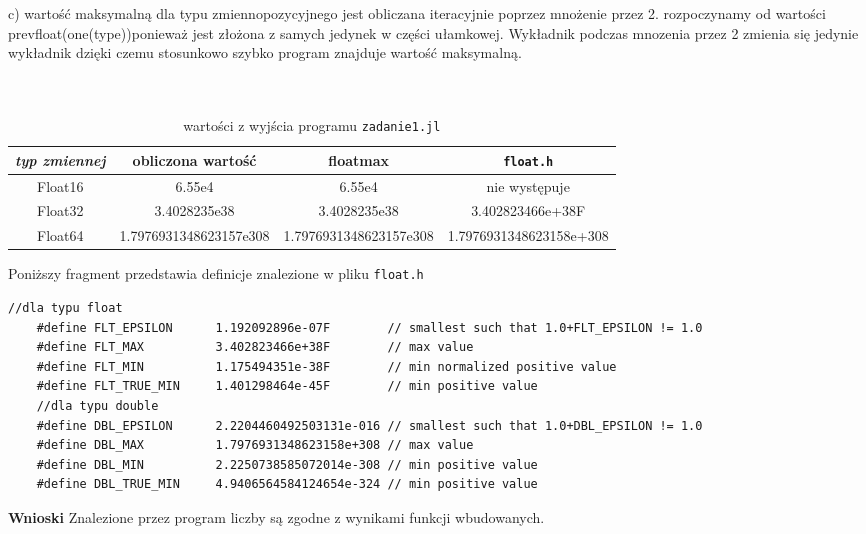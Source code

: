 \documentclass[11pt, a4paper]{article}
\begin{document}
c) wartość maksymalną dla typu zmiennopozycyjnego jest obliczana iteracyjnie poprzez mnożenie przez 2. rozpoczynamy od wartości prevfloat(one(type))ponieważ jest złożona z samych jedynek w części ułamkowej. Wykładnik podczas mnozenia przez 2 zmienia się jedynie wykładnik dzięki czemu stosunkowo szybko program znajduje wartość maksymalną.\\\\\\

 \begin{table}[ht]
    \centering
    \begin{tabular}{|c|c|c|c|}
      \hline
      \emph{typ zmiennej} & obliczona wartość & floatmax & \texttt{float.h} \\
      \hline
      \hline
      Float16 & 6.55e4 & 6.55e4 & nie występuje \\
      Float32 & 3.4028235e38 & 3.4028235e38 & 3.402823466e+38F \\
      Float64 & 1.7976931348623157e308 & 1.7976931348623157e308 & 1.7976931348623158e+308 \\
      \hline
    \end{tabular}
    \caption{wartości z wyjścia programu \texttt{zadanie1.jl}}
  \end{table}
  Poniższy fragment przedstawia definicje znalezione w pliku \verb|float.h|

  \begin{lstlisting}[style=CStyle, breaklines]
    //dla typu float
    #define FLT_EPSILON      1.192092896e-07F        // smallest such that 1.0+FLT_EPSILON != 1.0
    #define FLT_MAX          3.402823466e+38F        // max value
    #define FLT_MIN          1.175494351e-38F        // min normalized positive value
    #define FLT_TRUE_MIN     1.401298464e-45F        // min positive value
    //dla typu double
    #define DBL_EPSILON      2.2204460492503131e-016 // smallest such that 1.0+DBL_EPSILON != 1.0
    #define DBL_MAX          1.7976931348623158e+308 // max value
    #define DBL_MIN          2.2250738585072014e-308 // min positive value
    #define DBL_TRUE_MIN     4.9406564584124654e-324 // min positive value
  \end{lstlisting}

  \textbf{Wnioski}
  Znalezione przez program liczby są zgodne z wynikami funkcji wbudowanych. 
\end{document}
